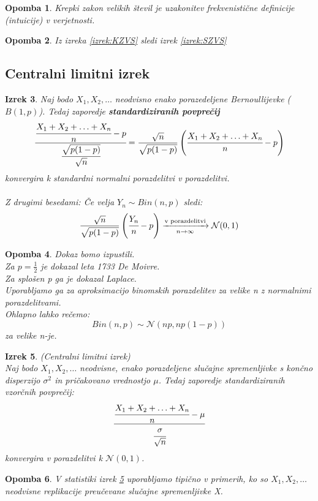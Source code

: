\documentclass[11pt]{article}
\newtheorem{Izrek}{{\sc Izrek}}[section]
\newtheorem{Opomba}[Izrek]{{\sc Opomba}}
\begin{document}
	\begin{Opomba}
		Krepki zakon velikih števil je uzakonitev frekvenistične definicije (intuicije) v verjetnosti.
	\end{Opomba}
	\begin{Opomba}
		Iz izreka \ref{izrek:KZVS} sledi izrek \ref{izrek:SZVS}
	\end{Opomba}
	\subsection{Centralni limitni izrek}
	\begin{Izrek}
		Naj bodo $X_1, X_2, \ldots$ neodvisno enako porazedeljene Bernoullijevke ($B(1,p)$). Tedaj zaporedje \textbf{standardiziranih povprečij}
		$$\cfrac{\cfrac{X_1+X_2 + \ldots + X_n}{n} - p}{ \cfrac{\sqrt{p(1-p)}}{ \sqrt{n} } }  =
		 \frac{\sqrt{n}}{\sqrt{p(1-p)}} \left(  \cfrac{X_1+X_2 + \ldots + X_n}{n} - p \right)$$
		konvergira k standardni normalni porazdelitvi v porazdelitvi. 
		\\
		\\
		Z drugimi besedami: Če velja $Y_n \sim Bin(n,p)$ sledi:
		$$\frac{\sqrt{n}}{\sqrt{p(1-p)}} \left(  \cfrac{Y_n}{n} - p \right) \xrightarrow[n\to \infty]{\textnormal{v porazdelitvi}} \mathcal{N}(0,1)$$
		\end{Izrek}
	\begin{Opomba}
		Dokaz bomo izpustili.
		\\
		Za $p = \frac{1}{2}$ je dokazal leta 1733 De Moivre.
		\\
		Za splošen p ga je dokazal Laplace.
		\\
		Uporabljamo ga za aproksimacijo binomskih porazdelitev za velike n z normalnimi porazdelitvami.
		\\
		Ohlapno lahko rečemo:
		$$Bin(n,p)\sim \mathcal{N}(np,np(1-p))$$
		za velike n-je.
	\end{Opomba}
	\begin{Izrek}\label{izrek:CTI}
		(Centralni limitni izrek)
		\\
		Naj bodo $X_1, X_2, \ldots$ neodvisne, enako porazdeljene slučajne spremenljivke s končno disperzijo $\sigma^2$ in pričakovano vrednostjo $\mu$. Tedaj zaporedje standardiziranih vzorčnih povprečij:
		$$\cfrac{\cfrac{X_1+X_2 + \ldots + X_n}{n} - \mu}{ \cfrac{\sigma}{ \sqrt{n} } } $$
		konvergira v porazdelitvi k $\mathcal{N}(0,1)$.
	\end{Izrek}
\begin{Opomba}
	V statistiki izrek \ref{izrek:CTI} uporabljamo tipično v primerih, ko so $X_1, X_2, \ldots$ neodvisne replikacije preučevane slučajne spremenljivke X.
\end{Opomba}
\end{document}
